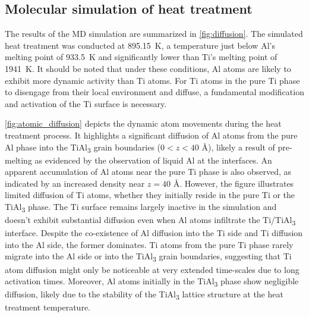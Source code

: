 \subsection{Molecular simulation of heat treatment}
\label{sec:md_results}
The results of the MD simulation are summarized in \cref{fig:diffusion}. The simulated heat treatment was conducted at \SI{895.15}{\kelvin}, a temperature just below Al's melting point of \SI{933.5}{\kelvin} and significantly lower than Ti's melting point of \SI{1941}{\kelvin}. It should be noted that under these conditions, Al atoms are likely to exhibit more dynamic activity than Ti atoms. For Ti atoms in the pure Ti phase to disengage from their local environment and diffuse, a fundamental modification and activation of the Ti surface is necessary.

\cref{fig:atomic_diffusion} depicts the dynamic atom movements during the heat treatment process. It highlights a significant diffusion of Al atoms from the pure Al phase into the TiAl\textsubscript{3} grain boundaries ($0 < z < 40$ \AA), likely a result of pre-melting as evidenced by the observation of liquid Al at the interfaces. An apparent accumulation of Al atoms near the pure Ti phase is also observed, as indicated by an increased density near $z = 40$ \AA. However, the figure illustrates limited diffusion of Ti atoms, whether they initially reside in the pure Ti or the TiAl\textsubscript{3} phase. The Ti surface remains largely inactive in the simulation and doesn't exhibit substantial diffusion even when Al atoms infiltrate the Ti/TiAl\textsubscript{3} interface. Despite the co-existence of Al diffusion into the Ti side and Ti diffusion into the Al side, the former dominates. Ti atoms from the pure Ti phase rarely migrate into the Al side or into the TiAl\textsubscript{3} grain boundaries, suggesting that Ti atom diffusion might only be noticeable at very extended time-scales due to long activation times. Moreover, Al atoms initially in the TiAl\textsubscript{3} phase show negligible diffusion, likely due to the stability of the TiAl\textsubscript{3} lattice structure at the heat treatment temperature.

